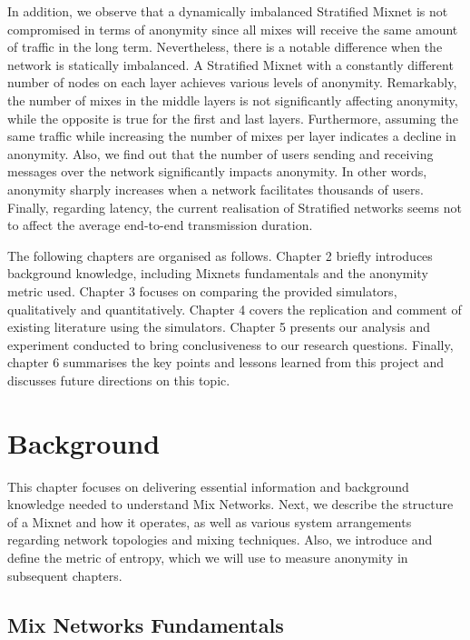 \documentclass[logo,msc,cyber]{infthesis}   %
\begin{document}
In addition, we observe that a dynamically imbalanced Stratified Mixnet is not
compromised in terms of anonymity since all mixes will receive the same amount
of traffic in the long term. Nevertheless, there is a notable difference when
the network is statically imbalanced. A Stratified Mixnet with a constantly
different number of nodes on each layer achieves various levels of anonymity.
Remarkably, the number of mixes in the middle layers is not significantly
affecting anonymity, while the opposite is true for the first and last layers.
Furthermore, assuming the same traffic while increasing the number of mixes per
layer indicates a decline in anonymity. Also, we find out that the number of
users sending and receiving messages over the network significantly impacts
anonymity. In other words, anonymity sharply increases when a network
facilitates thousands of users. Finally, regarding latency, the current
realisation of Stratified networks seems not to affect the average end-to-end
transmission duration.

The following chapters are organised as follows. Chapter 2 briefly introduces
background knowledge, including Mixnets fundamentals and the anonymity metric
used. Chapter 3 focuses on comparing the provided simulators, qualitatively and
quantitatively. Chapter 4 covers the replication and comment of existing
literature using the simulators. Chapter 5 presents our analysis and experiment
conducted to bring conclusiveness to our research questions. Finally, chapter 6
summarises the key points and lessons learned from this project and discusses
future directions on this topic.


\chapter{Background}
This chapter focuses on delivering essential information and background
knowledge needed to understand Mix Networks. Next, we describe the structure of
a Mixnet and how it operates, as well as various system arrangements regarding
network topologies and mixing techniques. Also, we introduce and define the
metric of entropy, which we will use to measure anonymity in subsequent chapters.

\section{Mix Networks Fundamentals} 
\end{document}

